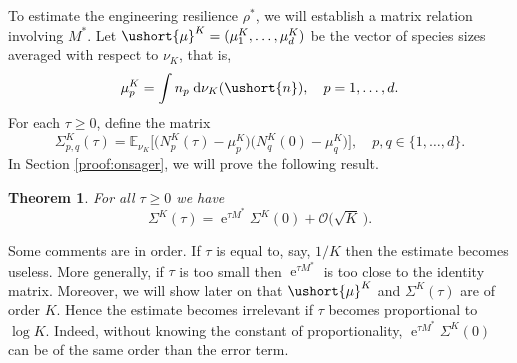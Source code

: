 \documentclass[JEP,XML,SOM,Unicode]{cedram}
\let\mathcal\mathscr
\numberwithin{equation}{section}
\theoremstyle{plain}
\newtheorem{theorem}{Theorem}[section]
\theoremstyle{definition}
\newcommand{\E}{{\mathbb{E}}}
\newcommand{\sK}{K}
\newcommand{\vecn}{\ushort{n}}
\newcommand{\vmu}{\ushort{\mu}}
\newcommand{\res}{\rho^*}
\newcommand{\nuk}{\nu_{K}}\let\snuk\nuk
\newcommand{\e}{\operatorname{e}}
\newcommand{\dd}{\hspace{1pt}\mathrm{d}}
\begin{document}
To estimate the engineering resilience $\res$, we will establish a matrix relation involving $M^*$.
Let $\vmu^{\sK}=(\mu_1^{\sK},\ldots,\mu_d^{\sK})$ be the vector of species sizes averaged with respect to $\nuk$, that is,
\begin{equation}
\label{def-mup}
\mu_{p}^{\sK}=\int n_{p}\,\dd\nuk(\vecn),\quad p=1,\ldots,d.
\end{equation}
For each $\tau\geq 0$, define the matrix
\[
\Sigma^{\sK}_{p,q}(\tau)=
\E_{\snuk}\bigl[\bigl(N_{p}^{\sK}(\tau)-\mu_{p}^{\sK}\bigr)\bigl(N_{q}^{\sK}(0)-\mu_{q}^{\sK}\bigr)\bigr],\quad p,q \in \{1, \ldots, d\}.
\]
In Section \ref{proof:onsager}, we will prove the following result.
\begin{theorem}
\label{thm-onsager-relation}
For all $\tau\geq 0$ we have
\begin{equation}\label{onsager}
\Sigma^{\sK}(\tau)=\e^{\tau M^*}\Sigma^{\sK}(0)+\mathcal{O}\bigl(\sqrt{K}\,\bigr).
\end{equation}
\end{theorem}
Some comments are in order. If $\tau$ is equal to, say, $1/K$ then the estimate becomes useless. More generally, if $\tau$ is too small then
$\e^{\tau M^*}$ is too close to the identity matrix.
Moreover, we will show later on that $\vmu^{\sK}$ and $\Sigma^{\sK}(\tau)$ are of order $K$. Hence the estimate becomes irrelevant
if $\tau$ becomes proportional to $\log K$. Indeed, without knowing the constant of proportionality, $\e^{\tau M^*}\Sigma^{\sK}(0)$ can be of the same
order than the error term.
\end{document}
